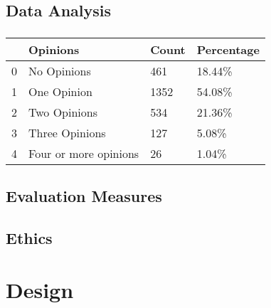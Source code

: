 \documentclass[11pt]{article}
\begin{document}


\subsection{Data Analysis}
\subsubsection{}
\begin{tabular}{llll}
\toprule
{} &               Opinions & Count & Percentage \\
\midrule
0 &            No Opinions &   461 &     18.44\% \\
1 &            One Opinion &  1352 &     54.08\% \\
2 &           Two Opinions &   534 &     21.36\% \\
3 &         Three Opinions &   127 &      5.08\% \\
4 &  Four or more opinions &    26 &      1.04\% \\
\bottomrule
\end{tabular}
\subsection{Evaluation Measures} \label{evaluationmeasures}
\subsection{Ethics}


\newpage

\section{Design}
\end{document}
